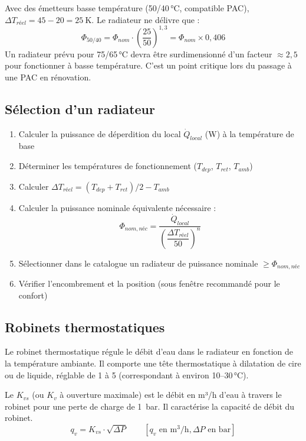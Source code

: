 \begin{attention}
Avec des émetteurs basse température (50/40\,°C, compatible PAC), $\Delta T_{réel} = 45 - 20 = \SI{25}{\kelvin}$. Le radiateur ne délivre que :
\[
  \Phi_{50/40} = \Phi_{nom} \cdot \left(\frac{25}{50}\right)^{1{,}3} = \Phi_{nom} \times 0{,}406
\]
Un radiateur prévu pour 75/65\,°C devra être surdimensionné d'un facteur $\approx 2{,}5$ pour fonctionner à basse température. C'est un point critique lors du passage à une PAC en rénovation.
\end{attention}

\subsection{Sélection d'un radiateur}

\begin{methode}[title=Sélection d'un radiateur sur catalogue]
\begin{enumerate}
  \item Calculer la puissance de déperdition du local $\dot{Q}_{local}$ (W) à la température de base
  \item Déterminer les températures de fonctionnement ($T_{dep}$, $T_{ret}$, $T_{amb}$)
  \item Calculer $\Delta T_{réel} = (T_{dep} + T_{ret})/2 - T_{amb}$
  \item Calculer la puissance nominale équivalente nécessaire :
  \[
    \Phi_{nom,néc} = \frac{\dot{Q}_{local}}{\left(\dfrac{\Delta T_{réel}}{50}\right)^n}
  \]
  \item Sélectionner dans le catalogue un radiateur de puissance nominale $\geq \Phi_{nom,néc}$
  \item Vérifier l'encombrement et la position (sous fenêtre recommandé pour le confort)
\end{enumerate}
\end{methode}

\subsection{Robinets thermostatiques}

Le robinet thermostatique régule le débit d'eau dans le radiateur en fonction de la température ambiante. Il comporte une tête thermostatique à dilatation de cire ou de liquide, réglable de 1 à 5 (correspondant à environ 10--30\,°C).

\begin{definition}[title=Kvs du robinet thermostatique]
Le $K_{vs}$ (ou $K_v$ à ouverture maximale) est le débit en m³/h d'eau à travers le robinet pour une perte de charge de \SI{1}{\bar}. Il caractérise la capacité de débit du robinet.
\begin{equation}
  q_v = K_{vs} \cdot \sqrt{\Delta P} \qquad \left[q_v \text{ en m}^3/\text{h}, \Delta P \text{ en bar}\right]
\end{equation}
\end{definition}

